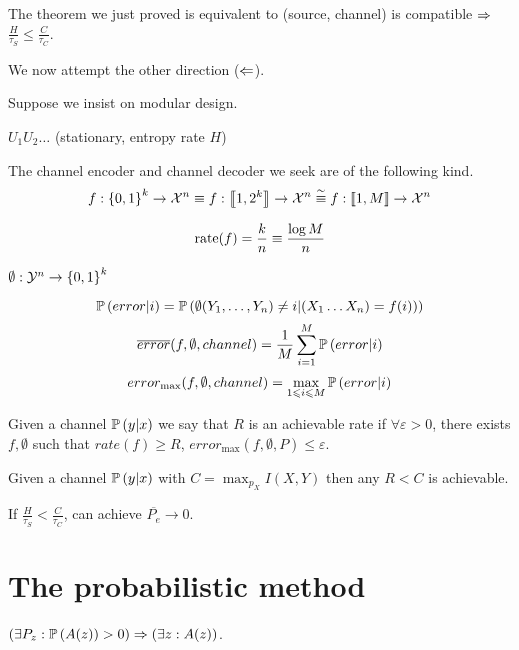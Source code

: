 The theorem we just proved is equivalent to (source, channel) is compatible $\Rightarrow$ $\frac{H}{\tau_S} \leqslant \frac{C}{\tau_C}$.

We now attempt the other direction ($\Leftarrow$).

Suppose we insist on modular design.

$U_1U_2\ldots$ (stationary, entropy rate $H$)

The channel encoder and channel decoder we seek are of the following kind.
\[
    f:\left\{ 0,1 \right\}^k \to \mathcal{X}^n \equiv f:\left\llbracket 1,2^k \right\rrbracket \to \mathcal{X}^n\overset{\sim}{\equiv} f:\left\llbracket 1,M \right\rrbracket \to \mathcal{X}^n
\]

\begin{definition}
    \[
        \operatorname{rate}(f) = \frac{k}{n} \equiv \frac{\log M}{n}
    \]
\end{definition}

$\emptyset : \mathcal{Y}^n \to \left\{ 0,1 \right\}^k$

\begin{definition}
    \[
        \mathbb{P}\left( error\vert i \right) = \mathbb{P}\left( \emptyset(Y_1,\ldots,Y_n) \neq i \vert (X_1\ldots X_n) = f(i)) \right)    
    \]
    \[
        \overline{error}(f,\emptyset,channel) = \frac{1}{M} \sum\limits_{i=1}^M \mathbb{P}\left( error\vert i \right)    
    \]
    \[
        error_{\max}(f,\emptyset,channel) = \max\limits_{1\leqslant i\leqslant M} \mathbb{P}\left( error \vert i \right)
    \]
\end{definition}

\begin{definition}
    Given a channel $\mathbb{P}\left( y\vert x \right)$ we say that $R$ is an achievable rate if $\forall \varepsilon > 0$, there exists $f,\emptyset$ such that $rate(f) \geqslant R$, $error_{\max}(f,\emptyset, P) \leqslant \varepsilon$.
\end{definition}

\begin{theorem}
    Given a channel $\mathbb{P}\left( y\vert x \right)$ with $C= \max_{p_X} I(X,Y)$ then any $R < C$ is achievable.
\end{theorem}

\begin{theorem}
    If $\frac{H}{\tau_S} < \frac{C}{\tau_C}$, can achieve $\overline{P_e} \to 0$.
\end{theorem}


\section{The probabilistic method}

$(\exists P_z : \mathbb{P}\left( A(z) \right) > 0)\Rightarrow(\exists z : A(z))$.


